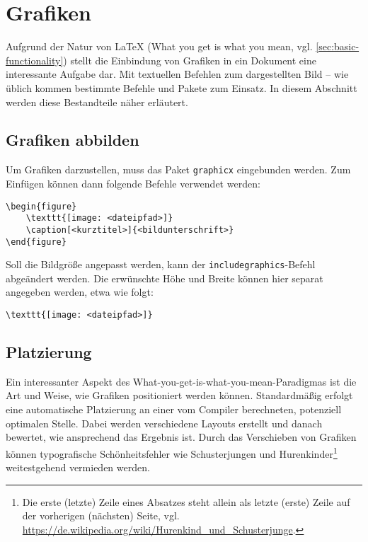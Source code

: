 \chapter{Grafiken}
\label{sec:graphics}

Aufgrund der Natur von \LaTeX{} (What you get is what you mean, vgl. \cref{sec:basic-functionality}) stellt die Einbindung von Grafiken in ein Dokument eine interessante Aufgabe dar. Mit textuellen Befehlen zum dargestellten Bild  -- wie üblich kommen bestimmte Befehle und Pakete zum Einsatz. In diesem Abschnitt werden diese Bestandteile näher erläutert.

\section{Grafiken abbilden}
\label{sec:display-graphics}
Um Grafiken darzustellen, muss das Paket \texttt{graphicx} eingebunden werden. Zum Einfügen können dann folgende Befehle verwendet werden:  

\begin{verbatim}
\begin{figure}
	\texttt{[image: <dateipfad>]}
	\caption[<kurztitel>]{<bildunterschrift>}
\end{figure}
\end{verbatim}

\noindent Soll die Bildgröße angepasst werden, kann der \texttt{includegraphics}-Befehl abgeändert werden. 
Die erwünschte Höhe und Breite können hier separat angegeben werden, etwa wie folgt: 

\begin{verbatim}
\texttt{[image: <dateipfad>]}
\end{verbatim}

\section{Platzierung}
\label{sec:graphics-placement}
Ein interessanter Aspekt des What-you-get-is-what-you-mean-Paradigmas ist die Art und Weise, wie Grafiken positioniert werden können. 
Standardmäßig erfolgt eine automatische Platzierung an einer vom Compiler berechneten, potenziell optimalen Stelle.
Dabei werden verschiedene Layouts erstellt und danach bewertet, wie ansprechend das Ergebnis ist.
Durch das Verschieben von Grafiken können typografische Schönheitsfehler wie Schusterjungen und Hurenkinder\footnote{Die erste (letzte) Zeile eines Absatzes steht allein als letzte (erste) Zeile auf der vorherigen (nächsten) Seite, vgl. \url{https://de.wikipedia.org/wiki/Hurenkind_und_Schusterjunge}.} weitestgehend vermieden werden. 

